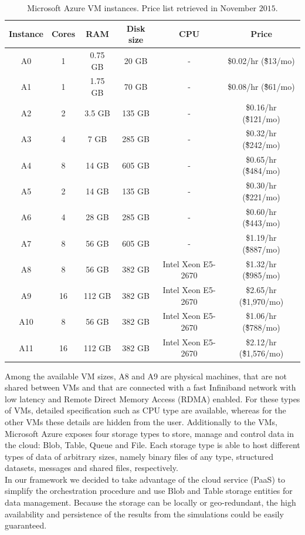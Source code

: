 \documentclass[3p,times]{elsarticle}
\begin{document}
	\begin{center}
	\begin{table}[h]
				\begin{tabular}{|c|c|c|c|c|c|}
			\hline
			Instance & Cores & RAM     & Disk size & CPU & Price                    \\ \hline
				A0     & 1     & 0.75 GB & 20 GB      & - & \$0.02/hr (\~\$13/mo)    \\ \hline
				A1     & 1     & 1.75 GB & 70 GB      & - & \$0.08/hr (\~\$61/mo)    \\ \hline
				A2     & 2     & 3.5 GB  & 135 GB     & - & \$0.16/hr (\~\$121/mo)   \\ \hline
				A3     & 4     & 7 GB    & 285 GB     & - & \$0.32/hr (\~\$242/mo)   \\ \hline
				A4     & 8     & 14 GB   & 605 GB     & - & \$0.65/hr (\~\$484/mo)   \\ \hline
				A5     & 2     & 14 GB   & 135 GB     & - & \$0.30/hr (\~\$221/mo)   \\ \hline
				A6     & 4     & 28 GB   & 285 GB     & - & \$0.60/hr (\~\$443/mo)   \\ \hline
				A7     & 8     & 56 GB   & 605 GB     & - & \$1.19/hr (\~\$887/mo)  \\ \hline
				A8     & 8     & 56 GB   & 382 GB     & Intel Xeon E5-2670 & \$1.32/hr (\~\$985/mo) \\ \hline
				A9     & 16    & 112 GB  & 382 GB     & Intel Xeon E5-2670 & \$2.65/hr (\~\$1,970/mo) \\ \hline
				A10    & 8     & 56 GB   & 382 GB     & Intel Xeon E5-2670 & \$1.06/hr (\~\$788/mo) \\ \hline
				A11    & 16    & 112 GB  & 382 GB     & Intel Xeon E5-2670 & \$2.12/hr (\~\$1,576/mo) \\ \hline
			\end{tabular}		
			\caption{Microsoft Azure VM instances. Price list retrieved in November $2015$.}
			\label{tab:azureVMs}	

	\end{table}
\end{center}
 
Among the available VM sizes, A8 and A9 are physical machines, that are not shared between VMs and that are connected with a fast Infiniband network with low latency and Remote Direct Memory Access (RDMA) enabled. For these types of VMs, detailed specification such as CPU type are available, whereas for the other VMs these details are hidden from the user.  
Additionally to the VMs, Microsoft Azure exposes four storage types to store, manage and control data in the cloud: Blob, Table, Queue and File. Each storage type is able to host different types of data of arbitrary sizes, namely binary files of any type, structured datasets, messages and shared files, respectively. \\
In our framework we decided to take advantage of the cloud service (PaaS) to simplify the orchestration procedure and use Blob and Table storage entities for data management. Because the storage can be locally or geo-redundant, the high availability and persistence of the results from the simulations could be easily guaranteed.
\end{document}
